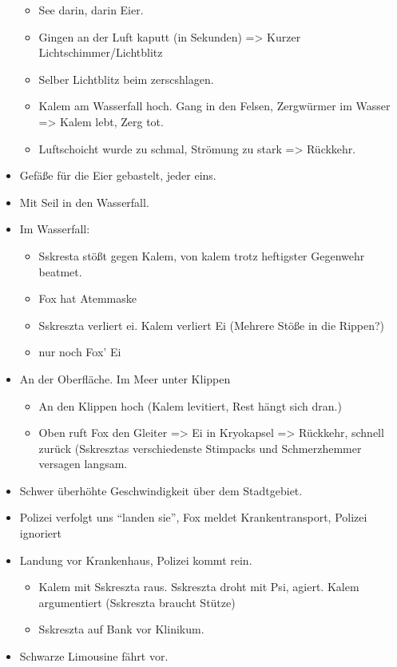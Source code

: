 \documentclass[11pt]{scrartcl}
\begin{document}
\begin{itemize}
  \begin{itemize}
  \item
    See darin, darin Eier.
  \item
    Gingen an der Luft kaputt (in Sekunden) =\textgreater{} Kurzer
    Lichtschimmer/Lichtblitz
  \item
    Selber Lichtblitz beim zerscshlagen.
  \item
    Kalem am Wasserfall hoch. Gang in den Felsen, Zergwürmer im Wasser
    =\textgreater{} Kalem lebt, Zerg tot.
  \item
    Luftschoicht wurde zu schmal, Strömung zu stark =\textgreater{}
    Rückkehr.
  \end{itemize}
\item
  Gefäße für die Eier gebastelt, jeder eins.
\item
  Mit Seil in den Wasserfall.
\item
  Im Wasserfall:

  \begin{itemize}
  \item
    Sskresta stößt gegen Kalem, von kalem trotz heftigster Gegenwehr
    beatmet.
  \item
    Fox hat Atemmaske
  \item
    Sskreszta verliert ei. Kalem verliert Ei (Mehrere Stöße in die
    Rippen?)
  \item
    nur noch Fox' Ei
  \end{itemize}
\item
  An der Oberfläche. Im Meer unter Klippen

  \begin{itemize}
  \item
    An den Klippen hoch (Kalem levitiert, Rest hängt sich dran.)
  \item
    Oben ruft Fox den Gleiter =\textgreater{} Ei in Kryokapsel
    =\textgreater{} Rückkehr, schnell zurück (Sskresztas verschiedenste
    Stimpacks und Schmerzhemmer versagen langsam.
  \end{itemize}
\item
  Schwer überhöhte Geschwindigkeit über dem Stadtgebiet.
\item
  Polizei verfolgt uns ``landen sie'', Fox meldet Krankentransport,
  Polizei ignoriert
\item
  Landung vor Krankenhaus, Polizei kommt rein.

  \begin{itemize}
  \item
    Kalem mit Sskreszta raus. Sskreszta droht mit Psi, agiert. Kalem
    argumentiert (Sskreszta braucht Stütze)
  \item
    Sskreszta auf Bank vor Klinikum.
  \end{itemize}
\item
  Schwarze Limousine fährt vor.


\end{itemize}
\end{document}

